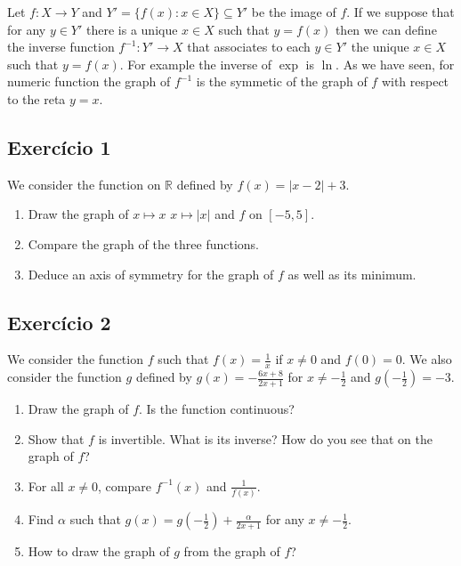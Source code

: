 Let $f: X \rightarrow Y$ and $Y' = \{ f(x) : x \in X \} \subseteq Y'$ be the
image of $f$. If we suppose that for any $y \in Y'$ there is a unique $x \in X$
such that $y = f(x)$ then we can define the inverse function
$f^{-1}: Y' \rightarrow X$ that associates to each $y \in Y'$ the unique
$x \in X$ such that $y = f(x)$. For example the inverse of $\exp$ is $\ln$.
As we have seen, for numeric function the graph of $f^{-1}$ is the symmetic
of the graph of $f$ with respect to the reta $y=x$.

\subsection*{Exercício 1}

We consider the function on $\mathbb R$ defined by $f(x) = {|x - 2|} + 3$.

\begin{enumerate}
\item Draw the graph of $x \mapsto x$ $x \mapsto |x|$ and $f$ on $[-5,5]$.
\item Compare the graph of the three functions.
\item Deduce an axis of symmetry for the graph of $f$ as well as its minimum.
\end{enumerate}

\subsection*{Exercício 2}

We consider the function $f$ such that $f(x) = \frac{1}{x}$ if $x \neq 0$
and $f(0) = 0$.
We also consider the function $g$ defined by
$g(x) = -\frac{6x+8}{2x+1}$ for $x \neq -\frac{1}{2}$ and
$g\left(-\frac{1}{2}\right)=-3$.

\begin{enumerate}
\item Draw the graph of $f$. Is the function continuous?
\item Show that $f$ is invertible. What is its inverse? How do you see that on
  the graph of $f$?
\item For all $x \neq 0$, compare $f^{-1}(x)$ and $\frac{1}{f(x)}$.
\item Find $\alpha$ such that
  $g(x) = g\left(-\frac{1}{2}\right) + \frac{\alpha}{2x+1}$ for any
  $x \neq -\frac{1}{2}$.
\item How to draw the graph of $g$ from the graph of $f$?
\end{enumerate}

